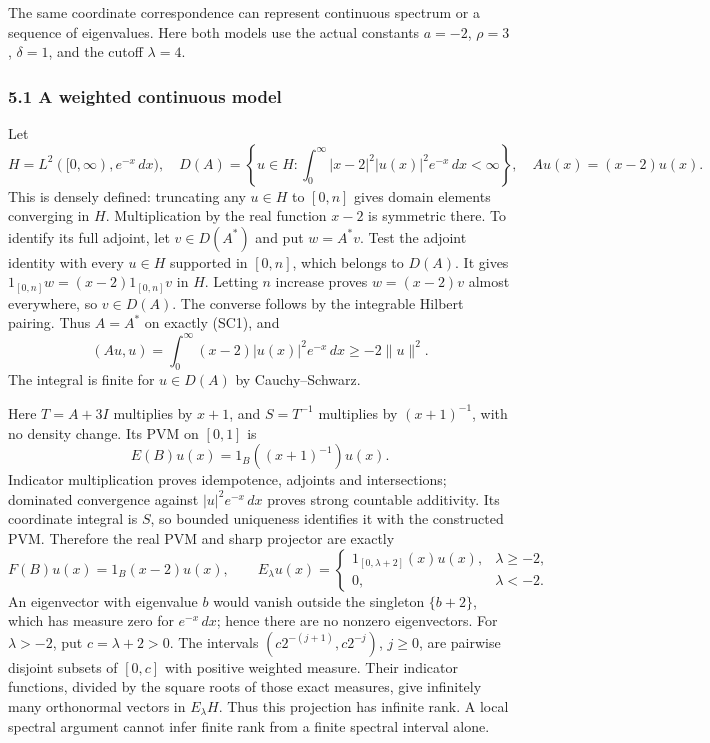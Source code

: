 \documentclass[
  11pt,
]{article}
\begin{document}
The same coordinate correspondence can represent continuous spectrum or
a sequence of eigenvalues. Here both models use the actual constants
\(a=-2\), \(\rho=3\), \(\delta=1\), and the cutoff \(\lambda=4\).

\subsubsection{5.1 A weighted continuous
model}\label{a-weighted-continuous-model}

Let \[
 H=L^2([0,\infty),e^{-x}\,dx),\quad
 D(A)=\left\{u\in H:\int_0^\infty|x-2|^2|u(x)|^2e^{-x}\,dx<\infty\right\},
 \quad Au(x)=(x-2)u(x).
 \tag{SC1}
\] This is densely defined: truncating any \(u\in H\) to \([0,n]\) gives
domain elements converging in \(H\). Multiplication by the real function
\(x-2\) is symmetric there. To identify its full adjoint, let
\(v\in D(A^*)\) and put \(w=A^*v\). Test the adjoint identity with every
\(u\in H\) supported in \([0,n]\), which belongs to \(D(A)\). It gives
\(1_{[0,n]}w=(x-2)1_{[0,n]}v\) in \(H\). Letting \(n\) increase proves
\(w=(x-2)v\) almost everywhere, so \(v\in D(A)\). The converse follows
by the integrable Hilbert pairing. Thus \(A=A^*\) on exactly (SC1), and
\[
 (Au,u)=\int_0^\infty(x-2)|u(x)|^2e^{-x}\,dx\geq-2\|u\|^2.
\] The integral is finite for \(u\in D(A)\) by Cauchy--Schwarz.

Here \(T=A+3I\) multiplies by \(x+1\), and \(S=T^{-1}\) multiplies by
\((x+1)^{-1}\), with no density change. Its PVM on \([0,1]\) is \[
 E(B)u(x)=1_B((x+1)^{-1})u(x).
 \tag{SC2}
\] Indicator multiplication proves idempotence, adjoints and
intersections; dominated convergence against \(|u|^2e^{-x}\,dx\) proves
strong countable additivity. Its coordinate integral is \(S\), so
bounded uniqueness identifies it with the constructed PVM. Therefore the
real PVM and sharp projector are exactly \[
 F(B)u(x)=1_B(x-2)u(x),\qquad
 E_\lambda u(x)=
 \begin{cases}1_{[0,\lambda+2]}(x)u(x),&\lambda\geq-2,\\
 0,&\lambda<-2.
 \end{cases}
 \tag{SC3}
\] An eigenvector with eigenvalue \(b\) would vanish outside the
singleton \(\{b+2\}\), which has measure zero for \(e^{-x}\,dx\); hence
there are no nonzero eigenvectors. For \(\lambda>-2\), put
\(c=\lambda+2>0\). The intervals \((c2^{-(j+1)},c2^{-j})\), \(j\geq0\),
are pairwise disjoint subsets of \([0,c]\) with positive weighted
measure. Their indicator functions, divided by the square roots of those
exact measures, give infinitely many orthonormal vectors in
\(E_\lambda H\). Thus this projection has infinite rank. A local
spectral argument cannot infer finite rank from a finite spectral
interval alone.
\end{document}

